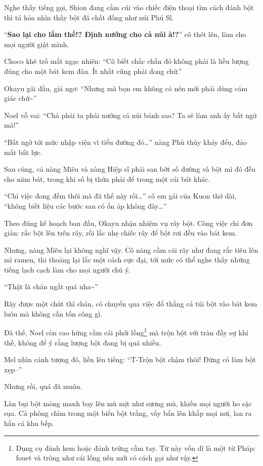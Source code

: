 \documentclass[../main.tex]{subfiles}
\begin{document}
Nghe thấy tiếng gọi, Shion đang cắm cúi vào chiếc điện thoại tìm cách đánh bột thì tá hỏa nhìn thấy bột đã chất đống như núi Phú Sĩ.

``\textbf{Sao lại cho lắm thế!? Định nướng cho cả núi à!?}'' cô thét lên, làm cho mọi người giật mình.

Choco khẽ trố mắt ngạc nhiên: ``Cô biết chắc chắn đó không phải là liều lượng đúng cho một bát kem đâu. Ít nhất cũng phải đong chứ.''

Okayu gãi đầu, giả ngơ: ``Nhưng mà bọn em không có nên mới phải dùng cảm giác chứ\~{}''

Noel vỗ vai: ``Chả phải ta phải nướng cả núi bánh sao? Ta sẽ làm anh ấy bất ngờ mà!''

``Bất ngờ tới mức nhập viện vì tiểu đường đó\dots'' nàng Phù thủy kháy đểu, đảo mắt bất lực.

Sau cùng, cả nàng Miêu và nàng Hiệp sĩ phải san bớt số đường và bột mì đó đều cho năm bát, trong khi số bị thừa phải để trong một cái bát khác.

``Chỉ việc đong đếm thôi mà đã thế này rồi\dots'' cô em gái của Kuon thở dài, ``không biết liệu các bước sau có ổn áp không đây\dots''

\ct

Theo đúng kế hoạch ban đầu, Okayu nhận nhiệm vụ rây bột. Công việc chỉ đơn giản: rắc bột lên trên rây, rồi lắc nhẹ chiếc rây để bột rơi đều vào bát kem.

Nhưng, nàng Miêu lại không nghĩ vậy. Cô nàng cầm cái rây như đang rắc tiêu lên mì ramen, thi thoảng lại lắc một cách cực đại, tới mức có thể nghe thấy những tiếng lạch cạch làm cho mọi người chú ý.

``Thật là chán ngắt quá nha\~{}''

Rây được một chút thì chán, cô chuyển qua việc đổ thẳng cả túi bột vào bát kem luôn mà không cần tốn công gì.

Đã thế, Noel còn cao hứng cầm cái phới lồng\footnote{Dụng cụ đánh kem hoặc đánh trứng cầm tay. Từ này vốn dĩ là một từ Pháp: fouet và trông như cái lồng nên mới có cách gọi như vậy.} mà trộn bột với tràn đầy sự khí thế, không để ý rằng lượng bột đang bị quá nhiều.

Mel nhìn cảnh tượng đó, liền lên tiếng: ``T-Trộn bột chậm thôi! Đừng có làm bột xẹp--''

Nhưng rồi, quá đã muộn.

Làn bụi bột mỏng manh bay lên mù mịt như sương mù, khiến mọi người ho sặc sụa. Cả phòng chìm trong một biển bột trắng, vấy bẩn lên khắp mọi nơi, lan ra hẳn cả khu bếp.
\end{document}
